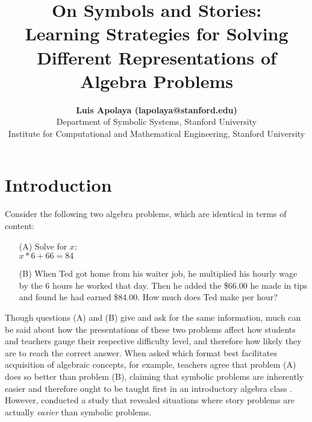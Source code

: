 \documentclass[10pt,letterpaper]{article}
\title{On Symbols and Stories:\\Learning Strategies for Solving Different Representations of Algebra Problems}
\author{{\large \bf Luis Apolaya (lapolaya@stanford.edu)} \\
  Department of Symbolic Systems, Stanford University
  \AND {\large \bf Amy Shoemaker (amyshoe@stanford.edu)} \\
  Institute for Computational and Mathematical Engineering, Stanford University}
\newcommand\TODO[1]{\textcolor{red}{#1}}
\begin{document}
\maketitle


%


\section{Introduction}


Consider the following two algebra problems, which are identical in terms of content:

\begin{enumerate}
\item[(A)] Solve for $x$:\\ $x * 6 + 66 = 84$

\item[(B)] When Ted got home from his waiter job, he multiplied his hourly wage by the 6 hours he worked that day. Then he added the \$66.00 he made in tips and found he had earned \$84.00. How much does Ted make per hour?
\end{enumerate}

Though questions (A) and (B) give and ask for the same information, much can be said about how the presentations of these two problems affect how students and teachers gauge their respective difficulty level, and therefore how likely they are to reach the correct answer. When asked which format best facilitates acquisition of algebraic concepts, for example, teachers agree that problem (A) does so better than problem (B), claiming that symbolic problems are inherently easier and therefore ought to be taught first in an introductory algebra class \cite{KoedNath2004,Nathan2012}. However,  conducted a study that revealed situations where story problems are actually \textit{easier} than symbolic problems. 
\end{document}
